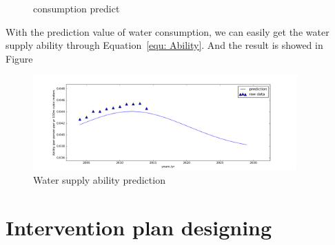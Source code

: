   \begin{figure}[!h]
  \caption{consumption predict}
  \label{fig: consumption predict}
  \end{figure}

  With the prediction value of water consumption, we can easily get the water supply ability through Equation~\ref{equ: Ability}. And the result is showed in Figure ~


  \begin{figure}[!h]
  \includegraphics[width = 0.9\textwidth]{picture/Ability-pre.png}
  \caption{Water supply ability prediction}
  \label{fig: supply ability}
  \end{figure}

\section{Intervention plan designing}

